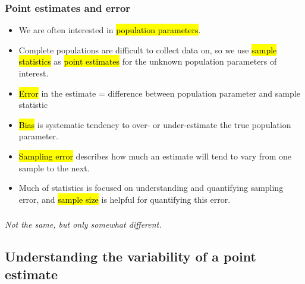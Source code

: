 \documentclass[t,compress,mathserif]{beamer}
\newcommand{\soln}[1]{\textit{#1}}
\begin{document}
\begin{frame}
    \frametitle{Point estimates and error}

    \begin{itemize}

        \item We are often interested in \hl{population parameters}.
        \item Complete populations are difficult to collect data on, so we use \hl{sample statistics} as \hl{point estimates} for the unknown population parameters of interest.
        \item \hl{Error} in the estimate = difference between population parameter and sample statistic
        \item \hl{Bias} is systematic tendency to over- or under-estimate the true population parameter.
        \item \hl{Sampling error} describes how much an estimate will tend to vary from one sample to the next.
        \item Much of statistics is focused on understanding and quantifying sampling error, and \hl{sample size} is helpful for quantifying this error.

    \end{itemize}

\end{frame}



\begin{frame}
    \frametitle{}
    
    
    \pause
    
    \soln{Not the same, but only somewhat different.}
    
\end{frame}


\subsection{Understanding the variability of a point estimate}

\end{document}
